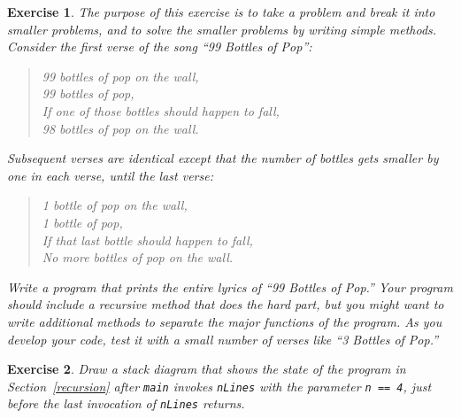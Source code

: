 \documentclass[12pt]{book}
\theoremstyle{exercise}
\newtheorem{exercise}{Exercise}[chapter]
\newcommand{\java}[1]{\verb"#1"}
\newcommand{\java}[1]{\lstinline{#1}} %
\begin{document}
\begin{exercise}

The purpose of this exercise is to take a problem and break it into smaller problems, and to solve the smaller problems by writing simple methods.
Consider the first verse of the song ``99 Bottles of Pop'':

\begin{quote}
99 bottles of pop on the wall,\\
99 bottles of pop,\\
If one of those bottles should happen to fall,\\
98 bottles of pop on the wall.
\end{quote}

Subsequent verses are identical except that the number of bottles gets smaller by one in each verse, until the last verse:

\begin{quote}
1 bottle of pop on the wall,\\
1 bottle of pop,\\
If that last bottle should happen to fall,\\
No more bottles of pop on the wall.
\end{quote}


Write a program that prints the entire lyrics of ``99 Bottles of Pop.''
Your program should include a {\it recursive} method that does the hard part, but you might want to write additional methods to separate the major functions of the program.
As you develop your code, test it with a small number of verses like ``3 Bottles of Pop.''

\end{exercise}


\begin{exercise}

Draw a stack diagram that shows the state of the program in Section~\ref{recursion} after \java{main} invokes \java{nLines} with the parameter \java{n == 4}, just before the last invocation of \java{nLines} returns.

\end{exercise}
\end{document}
